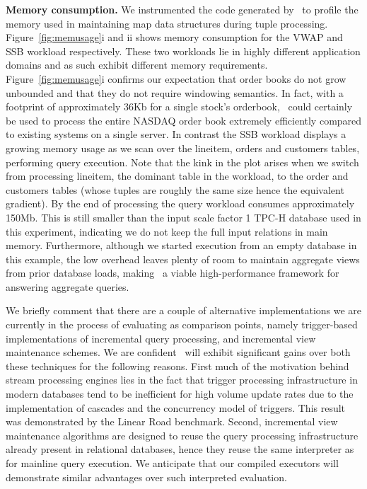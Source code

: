 \textbf{Memory consumption.}
We instrumented the code generated by \compiler\ to profile the memory used in
maintaining map data structures during tuple processing.
Figure~\ref{fig:memusage}i and ii shows memory consumption for the VWAP
and SSB workload respectively. These two workloads lie in highly different
application domains and as such exhibit different memory requirements.
Figure~\ref{fig:memusage}i confirms our expectation that order books do not
grow unbounded and that they do not require windowing semantics. In fact, with
a footprint of approximately 36Kb for a single stock's orderbook, \compiler\
could certainly be used to process the entire NASDAQ order book extremely
efficiently compared to existing systems on a single server.
In contrast the SSB workload displays a growing memory usage as we scan over the
lineitem, orders and customers tables, performing query execution. Note that the
kink in the plot arises when we switch from processing lineitem, the dominant
table in the workload, to the order and customers tables (whose tuples are
roughly the same size hence the equivalent gradient). By the end of processing
the query workload consumes approximately 150Mb. This is still smaller than the
input scale factor 1 TPC-H database used in this experiment, indicating we do
not keep the full input relations in main memory. Furthermore, although we
started execution from an empty database in this example, the low overhead
leaves plenty of room to maintain aggregate views from prior database loads,
making \compiler\ a viable high-performance framework for answering aggregate
queries.

We briefly comment that there are a couple of alternative implementations we
are currently in the process of evaluating as comparison points, namely
trigger-based implementations of incremental query processing, and incremental
view maintenance schemes. We are confident \compiler\ will exhibit significant
gains over both these techniques for the following reasons. First much of the
motivation behind stream processing engines lies in the fact that trigger
processing infrastructure in modern databases tend to be inefficient for
high volume update rates due to the implementation of cascades and the
concurrency model of triggers. This result was demonstrated by the Linear Road
benchmark. Second, incremental view maintenance algorithms are designed to
reuse the query processing infrastructure already present in relational
databases, hence they reuse the same interpreter as for mainline query
execution. We anticipate that our compiled executors will demonstrate
similar advantages over such interpreted evaluation.

